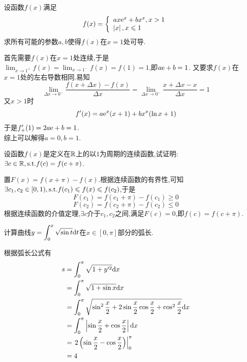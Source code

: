 \documentclass{ctexart}
\begin{document}
\begin{problem}[4.(8\songti{分})]
    设函数$f(x)$满足$$f(x)=\left\{\begin{array}{l}ax\mathrm{e}^x+bx^x,x>1\\\left|x\right|,x\leqslant1\end{array}\right.$$
    求所有可能的参数$a,b$使得$f(x)$在$x=1$处可导.
\end{problem}
\begin{solution}
    首先需要$f(x)$在$x=1$处连续,于是$\displaystyle\lim_{x\to1^+}f(x)=\lim_{x\to1^-}f(x)=f(1)=1$,即$a\mathrm{e}+b=1$.
    又要求$f(x)$在$x=1$处的左右导数相同.易知
    $$\lim_{\Delta x\to0^-}\dfrac{f(x+\Delta x)-f(x)}{\Delta x}=\lim_{\Delta x\to0^-}\dfrac{x+\Delta x-x}{\Delta x}=1$$
    又$x>1$时$$f'(x)=a\mathrm{e}^x(x+1)+bx^x(\ln x+1)$$
    于是$f'_+(1)=2a\mathrm{e}+b=1$.\\
    综上可以解得$a=0,b=1$.
\end{solution}
\begin{problem}[5.(12\songti{分})]
    设函数$f(x)$是定义在$\mathbb{R}$上的以$1$为周期的连续函数,试证明:$\exists c\in\mathbb{R},\text{s.t.} f(c)=f(c+\pi)$.
\end{problem}
\begin{solution}
    置$F(x)=f(x+\pi)-f(x)$.根据连续函数的有界性,可知$\exists c_1,c_2\in[0,1),\text{s.t.} f(c_1)\leqslant f(x)\leqslant f(c_2)$,于是
    $$F(c_1)=f(c_1+\pi)-f(c_1)\geqslant0$$
    $$F(c_2)=f(c_2+\pi)-f(c_2)\leqslant0$$
    根据连续函数的介值定理,$\exists c$介于$c_1,c_2$之间,满足$F(c)=0$,即$f(c)=f(c+\pi)$.
\end{solution}
\begin{problem}[6.(8\songti{分})]
    计算曲线$\displaystyle y=\int_0^x\sqrt{\sin t}\mathrm{d} t$在$x\in[0,\pi]$部分的弧长.
\end{problem}
\begin{solution}
    根据弧长公式有
    $$\begin{aligned}
        s
        &= \int_0^\pi\sqrt{1+y'^2}\mathrm{d} x \\
        &= \int_0^\pi\sqrt{1+\sin x}\mathrm{d} x \\
        &= \int_0^\pi\sqrt{\sin^2\dfrac{x}{2}+2\sin\dfrac{x}{2}\cos\dfrac{x}{2}+\cos^2\dfrac{x}{2}}\mathrm{d} x \\
        &= \int_0^\pi\left|\sin\dfrac{x}{2}+\cos\dfrac{x}{2}\right|\mathrm{d} x \\
        &= \left.2\left(\sin\dfrac{x}{2}-\cos\dfrac{x}{2}\right)\right|_0^\pi \\
        &= 4
    \end{aligned}$$
\end{solution}
\end{document}
